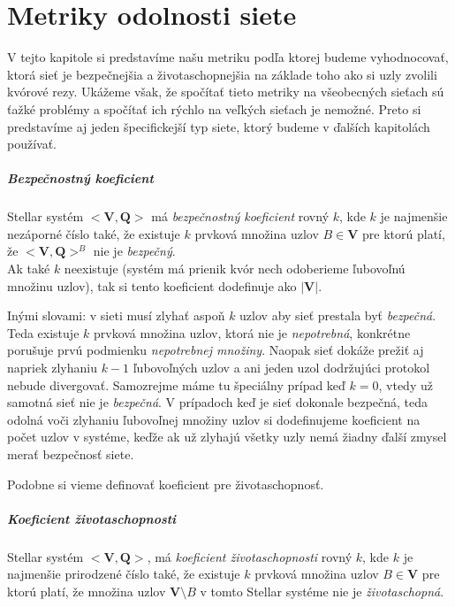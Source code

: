 \chapter{Metriky odolnosti siete}

V tejto kapitole si predstavíme našu metriku podľa ktorej budeme vyhodnocovať,
ktorá sieť je bezpečnejšia a životaschopnejšia na základe toho ako si uzly
zvolili kvórové rezy.
Ukážeme však, že spočítať tieto metriky na všeobecných sieťach sú ťažké
problémy a spočítať ich rýchlo na veľkých sieťach je nemožné.
Preto si predstavíme aj jeden špecifickejší typ siete, ktorý budeme v ďalších
kapitolách používať.

\paragraph {Bezpečnostný koeficient} Stellar systém $<\textbf{V},\textbf{Q}>$
má \textit{bezpečnostný koeficient} rovný $k$,
kde $k$ je najmenšie nezáporné číslo také, že existuje $k$ prvková množina
uzlov $B \in \textbf{V}$ pre ktorú platí, že $<\textbf{V}, \textbf{Q}>^B$ nie je
\textit{bezpečný}.\\
Ak také $k$ neexistuje (systém má prienik kvór nech odoberieme
ľubovoľnú množinu uzlov), tak si tento koeficient dodefinuje ako $|\textbf{V}|$.

\vspace{4mm}
Inými slovami: v sieti musí zlyhať aspoň $k$ uzlov aby sieť prestala byť
\textit{bezpečná}. Teda existuje $k$ prvková množina uzlov, ktorá nie je
\textit{nepotrebná}, konkrétne porušuje prvú podmienku \textit{nepotrebnej množiny}.
Naopak sieť dokáže prežiť aj napriek zlyhaniu $k-1$ ľubovoľných uzlov a ani
jeden uzol dodržujúci protokol nebude divergovať.
Samozrejme máme tu špeciálny prípad keď $k=0$, vtedy už samotná sieť nie je
\textit{bezpečná}.
V prípadoch keď je sieť dokonale bezpečná, teda odolná voči zlyhaniu ľubovoľnej
množiny uzlov si dodefinujeme koeficient na počet uzlov v systéme, keďže ak
už zlyhajú všetky uzly nemá žiadny ďalší zmysel merať bezpečnosť siete.

Podobne si vieme definovať koeficient pre životaschopnosť.

\paragraph {Koeficient životaschopnosti} Stellar systém $<\textbf{V},\textbf{Q}>$,
má \textit{koeficient životaschopnosti} rovný $k$, kde $k$ je najmenšie prirodzené
číslo také, že existuje $k$ prvková množina uzlov $B \in \textbf{V}$ pre ktorú
platí, že množina uzlov $\textbf{V} \setminus B$ v tomto Stellar systéme nie je
\textit{životaschopná}.

